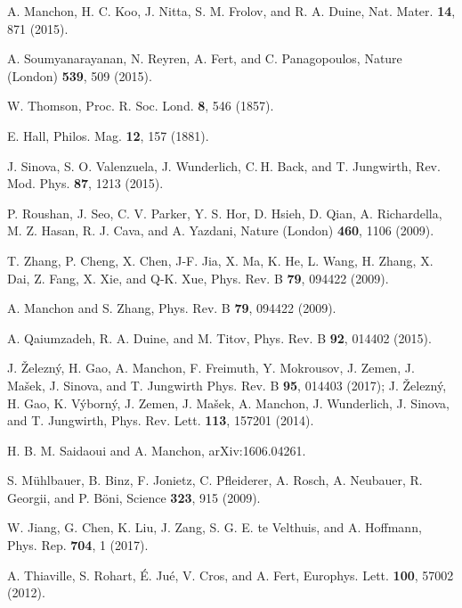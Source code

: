 \documentclass[aps,prl,twocolumn,amsmath,amssymb,superscriptaddress]{revtex4}%
\begin{document}
\begin{thebibliography}{9}

A. Manchon, H. C. Koo, J. Nitta, S. M. Frolov, and R. A. Duine, Nat. Mater. \textbf{14}, 871 (2015).

A. Soumyanarayanan, N. Reyren, A. Fert, and C. Panagopoulos, Nature (London) \textbf{539}, 509 (2015).

W. Thomson, Proc. R. Soc. Lond. \textbf{8}, 546 (1857).

E. Hall, Philos. Mag. \textbf{12}, 157 (1881).

J. Sinova, S. O. Valenzuela, J. Wunderlich, C. H. Back, and T. Jungwirth, Rev. Mod. Phys. \textbf{87}, 1213  (2015).

P. Roushan, J. Seo, C. V. Parker, Y. S. Hor, D. Hsieh, D. Qian, A. Richardella, M. Z. Hasan, R. J. Cava, and A. Yazdani, Nature (London) \textbf{460}, 1106 (2009).

T. Zhang, P. Cheng, X. Chen, J-F. Jia, X. Ma, K. He, L. Wang, H. Zhang, X. Dai, Z. Fang, X. Xie, and Q-K. Xue, Phys. Rev. B \textbf{79}, 094422 (2009).

A. Manchon and S. Zhang, Phys. Rev. B \textbf{79}, 094422 (2009).

A. Qaiumzadeh, R. A. Duine, and M. Titov, Phys. Rev. B \textbf{92}, 014402 (2015).

J. \v{Z}elezn\'{y}, H. Gao, A. Manchon, F. Freimuth, Y. Mokrousov, J. Zemen, J. Ma\v{s}ek, J. Sinova, and T. Jungwirth
Phys. Rev. B \textbf{95}, 014403 (2017); J. \v{Z}elezn\'{y}, H. Gao, K. V\'{y}born\'{y}, J. Zemen, J. Ma\v{s}ek, A. Manchon, J. Wunderlich, J. Sinova, and T. Jungwirth,
Phys. Rev. Lett. \textbf{113}, 157201 (2014).

H. B. M. Saidaoui and A. Manchon, arXiv:1606.04261.


S. M\"{u}hlbauer, B. Binz, F. Jonietz, C. Pfleiderer, A. Rosch, A. Neubauer, R. Georgii, and P. B\"{o}ni, Science \textbf{323}, 915 (2009).

W. Jiang, G. Chen, K. Liu, J. Zang, S. G. E. te Velthuis, and A. Hoffmann, Phys. Rep. \textbf{704}, 1 (2017).

A. Thiaville, S. Rohart, \'{E}. Ju\'{e}, V. Cros, and A. Fert, Europhys. Lett. \textbf{100}, 57002 (2012).


\end{thebibliography}
\end{document}

